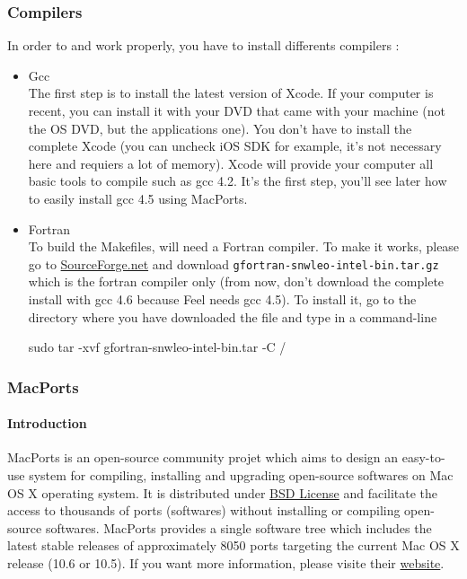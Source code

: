 \subsubsection{Compilers}

In order to \feel and \cmake work properly, you have to install differents compilers :
\begin{itemize}
\item Gcc \\
The first step is to install the latest version of Xcode. If your computer is recent, you can install it with your DVD that came with your machine (not the OS DVD, but the applications one). You don't have to install the complete Xcode (you can uncheck iOS SDK for example, it's not necessary here and requiers a lot of memory). Xcode will provide your computer all basic tools to compile such as gcc 4.2. It's the first step, you'll see later how to easily install gcc 4.5 using MacPorts.
\item Fortran \\
To build the Makefiles, \cmake will need a Fortran compiler. To make it works, please go to \href{http://hpc.sourceforge.net/}{SourceForge.net} and download \verb|gfortran-snwleo-intel-bin.tar.gz| which is the fortran compiler only (from now, don't download the complete install with gcc 4.6 because Feel needs gcc 4.5). To install it, go to the directory where you have downloaded the file and type in a command-line
\begin{unixcom}
		sudo tar -xvf gfortran-snwleo-intel-bin.tar -C /
\end{unixcom}

\end{itemize}

\subsubsection{MacPorts}

\paragraph{Introduction}
MacPorts is an open-source community projet which aims to design an easy-to-use system for compiling, installing and upgrading open-source softwares on Mac OS X operating system. It is distributed under \href{http://opensource.org/licenses/bsd-license.php}{BSD License} and facilitate the access to thousands of ports (softwares) without installing or compiling open-source softwares.
MacPorts provides a single software tree which includes the latest stable releases of approximately 8050 ports targeting the current Mac OS X release (10.6 or 10.5). If you want more information, please visite their \href{http://www.macports.org/}{website}.

